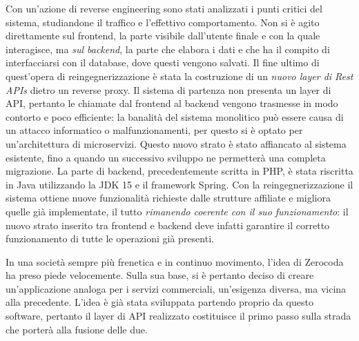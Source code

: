 \documentclass[
    corpo=11pt,
    twoside,
]{toptesi}
\begin{document}
Con un'azione di reverse engineering sono stati analizzati i punti critici del sistema, studiandone il traffico e l'effettivo comportamento. Non si è agito direttamente sul frontend, la parte visibile dall'utente finale e con la quale interagisce, ma \textit{sul backend}, la parte che elabora i dati e che ha il compito di interfacciarsi con il database, dove questi vengono salvati. Il fine ultimo di quest'opera di reingegnerizzazione è stata la costruzione di un \emph{nuovo layer di Rest APIs} dietro un reverse proxy. Il sistema di partenza non presenta un layer di API, pertanto le chiamate dal frontend al backend vengono trasmesse in modo contorto e poco efficiente: la banalità del sistema monolitico può essere causa di un attacco informatico o malfunzionamenti, per questo si è optato per un'architettura di microservizi. Questo nuovo strato è stato affiancato al sistema esistente, fino a quando un successivo sviluppo ne permetterà una completa migrazione. La parte di backend, precedentemente scritta in PHP, è stata riscritta in Java utilizzando la JDK 15 e il framework Spring. Con la reingegnerizzazione il sistema ottiene nuove funzionalità richieste dalle strutture affiliate e migliora quelle già implementate, il tutto \emph{rimanendo coerente con il suo funzionamento}: il nuovo strato inserito tra frontend e backend deve infatti garantire il corretto funzionamento di tutte le operazioni già presenti.

In una società sempre più frenetica e in continuo movimento, l'idea di Zerocoda ha preso piede velocemente. Sulla sua base, si è pertanto deciso di creare un'applicazione analoga per i servizi commerciali, un'esigenza  diversa, ma vicina alla precedente. L'idea è già stata sviluppata partendo proprio da questo software, pertanto il layer di API realizzato costituisce il primo passo sulla strada che porterà alla fusione delle due.


\tableofcontents

\listoffigures



\mainmatter







{}
\nocite{*}
\printbibliography
\end{document}

